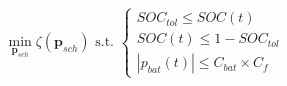 \begin{equation}
	\min_{\textbf{p}_{sch}}\zeta(\textbf{p}_{sch})
	\text{ s.t. }
	\begin{cases}
		SOC_{tol} \leq SOC(t)\\
		SOC(t) \leq 1-SOC_{tol}\\
		|p_{bat}(t)| \leq C_{bat} \times C_{f}
	\end{cases}
\label{ch2:equ:cost-minimisation}
\end{equation}